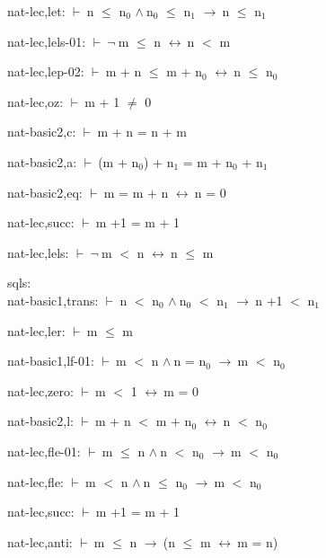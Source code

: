 \documentclass[a4paper]{article}
\newcommand{\Fol}{\mbox{$\vdash\ $}}
\newcommand{\Not}{\mbox{$\neg\ $}}
\newcommand{\And}{\mbox{$\wedge\ $}}
\newcommand{\Imp}{\mbox{$\rightarrow\ $}}
\newcommand{\Equiv}{\mbox{$\leftrightarrow\ $}}
\begin{document}
nat-lec,let: 
 \Fol n $\le$ $\mbox{n}_{0}$ \And $\mbox{n}_{0}$ $\le$ $\mbox{n}_{1}$ \Imp n $\le$ $\mbox{n}_{1}$



nat-lec,lels-01: 
 \Fol \Not m $\le$ n \Equiv n $<$ m



nat-lec,lep-02: 
 \Fol m + n $\le$ m + $\mbox{n}_{0}$ \Equiv n $\le$ $\mbox{n}_{0}$



nat-lec,oz: 
 \Fol m + 1 $\neq$ 0



nat-basic2,c: 
 \Fol m + n = n + m



nat-basic2,a: 
 \Fol (m + $\mbox{n}_{0}$) + $\mbox{n}_{1}$ = m + $\mbox{n}_{0}$ + $\mbox{n}_{1}$



nat-basic2,eq: 
 \Fol m = m + n \Equiv n = 0



nat-lec,succ: 
 \Fol m +1 = m + 1



nat-lec,lels: 
 \Fol \Not m $<$ n \Equiv n $\le$ m



\bigskip

sqls:\\ nat-basic1,trans: 
 \Fol n $<$ $\mbox{n}_{0}$ \And $\mbox{n}_{0}$ $<$ $\mbox{n}_{1}$ \Imp n +1 $<$ $\mbox{n}_{1}$

nat-lec,ler: 
 \Fol m $\le$ m



nat-basic1,lf-01: 
 \Fol m $<$ n \And n = $\mbox{n}_{0}$ \Imp m $<$ $\mbox{n}_{0}$



nat-lec,zero: 
 \Fol m $<$ 1 \Equiv m = 0



nat-basic2,l: 
 \Fol m + n $<$ m + $\mbox{n}_{0}$ \Equiv n $<$ $\mbox{n}_{0}$



nat-lec,fle-01: 
 \Fol m $\le$ n \And n $<$ $\mbox{n}_{0}$ \Imp m $<$ $\mbox{n}_{0}$



nat-lec,fle: 
 \Fol m $<$ n \And n $\le$ $\mbox{n}_{0}$ \Imp m $<$ $\mbox{n}_{0}$



nat-lec,succ: 
 \Fol m +1 = m + 1



nat-lec,anti: 
 \Fol m $\le$ n \Imp (n $\le$ m \Equiv m = n)
\end{document}
